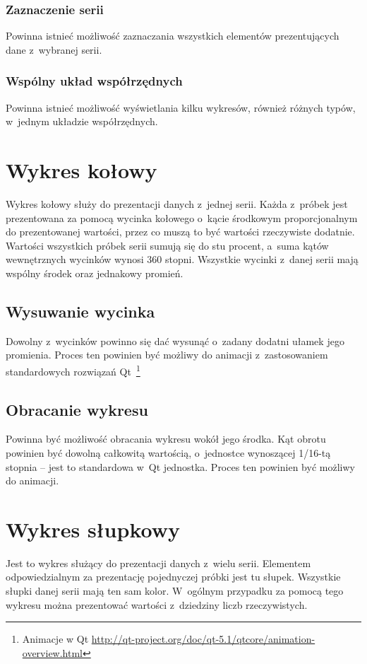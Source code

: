 \subsubsection{Zaznaczenie serii}
Powinna istnieć możliwość zaznaczania wszystkich elementów prezentujących dane z~wybranej serii.

\subsubsection{Wspólny układ współrzędnych}
Powinna istnieć możliwość wyświetlania kilku wykresów, również różnych typów, w~jednym układzie współrzędnych.

\section{Wykres kołowy}
Wykres kołowy służy do prezentacji danych z~jednej serii. Każda z~próbek jest prezentowana za pomocą wycinka kołowego o~kącie środkowym proporcjonalnym do prezentowanej wartości, przez co muszą to być wartości rzeczywiste dodatnie. Wartości wszystkich próbek serii sumują się do stu procent, a~suma kątów wewnętrznych wycinków wynosi 360 stopni. Wszystkie wycinki z~danej serii mają wspólny środek oraz jednakowy promień.

\subsection{Wysuwanie wycinka}
Dowolny z~wycinków powinno się dać wysunąć o~zadany dodatni ułamek jego promienia. Proces ten powinien być możliwy do animacji z~zastosowaniem standardowych rozwiązań Qt~\footnote{Animacje w Qt \url{http://qt-project.org/doc/qt-5.1/qtcore/animation-overview.html}}

\subsection{Obracanie wykresu}
Powinna być możliwość obracania wykresu wokół jego środka. Kąt obrotu powinien być dowolną całkowitą wartością, o~jednostce wynoszącej 1/16-tą stopnia -- jest to standardowa w~Qt jednostka. Proces ten powinien być możliwy do animacji.
 

\section{Wykres słupkowy}
Jest to wykres służący do prezentacji danych z~wielu serii. Elementem odpowiedzialnym za prezentację pojednyczej próbki jest tu słupek. Wszystkie słupki danej serii mają ten sam kolor. W~ogólnym przypadku za pomocą tego wykresu można prezentować wartości z~dziedziny liczb rzeczywistych.

